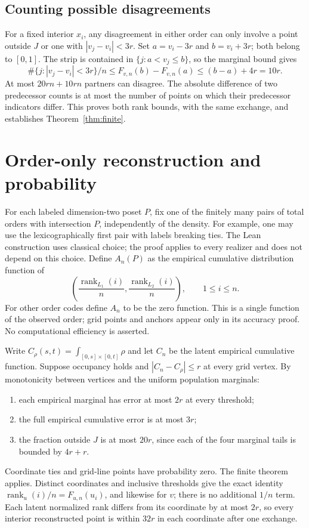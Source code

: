 \documentclass[11pt]{article}
\theoremstyle{remark}
\newcommand{\rank}{\operatorname{rank}}
\begin{document}
\subsection{Counting possible disagreements}
For a fixed interior $x_i$, any disagreement in either order can only
involve a point outside $J$ or one with $|v_j-v_i|<3r$.
Set $a=v_i-3r$ and $b=v_i+3r$; both belong to $[0,1]$.
The strip is contained in $\{j:a<v_j\le b\}$, so the marginal bound gives
\[
 \#\{j:|v_j-v_i|<3r\}/n
 \le F_{v,n}(b)-F_{v,n}(a)\le(b-a)+4r=10r.
\]
At most $20rn+10rn$ partners can disagree. The absolute difference
of two predecessor counts is at most the number of points on which
their predecessor indicators differ. This proves both rank bounds,
with the same exchange, and establishes Theorem~\ref{thm:finite}.

\section{Order-only reconstruction and probability}\label{sec:probability}
For each labeled dimension-two poset $P$, fix one of the finitely many
pairs of total orders with intersection $P$, independently of the density.
For example, one may use the lexicographically first pair with labels
breaking ties. The Lean construction uses classical choice; the proof
applies to every realizer and does not depend on this choice. Define $A_n(P)$ as the
empirical cumulative distribution function of
\[
 \left(\frac{\rank_{L_1}(i)}n,\frac{\rank_{L_2}(i)}n\right),\qquad1\le i\le n.
\]
For other order codes define $A_n$ to be the zero function. This is a single function
of the observed order; grid points and anchors appear only in its
accuracy proof. No computational efficiency is asserted.

Write $C_\rho(s,t)=\int_{[0,s]\times[0,t]}\rho$ and let $C_n$ be the
latent empirical cumulative function. Suppose occupancy holds and
$|C_n-C_\rho|\le r$ at every grid vertex. By monotonicity between
vertices and the uniform population marginals:
\begin{enumerate}
\item each empirical marginal has error at most $2r$ at every threshold;
\item the full empirical cumulative error is at most $3r$;
\item the fraction outside $J$ is at most $20r$, since each of the
four marginal tails is bounded by $4r+r$.
\end{enumerate}
Coordinate ties and grid-line points have probability zero.
The finite theorem applies. Distinct coordinates and inclusive thresholds
give the exact identity $\rank_u(i)/n=F_{u,n}(u_i)$, and likewise for $v$;
there is no additional $1/n$ term. Each latent normalized rank differs
from its coordinate by at most $2r$, so every interior reconstructed point
is within $32r$ in each coordinate after one exchange.
\end{document}
